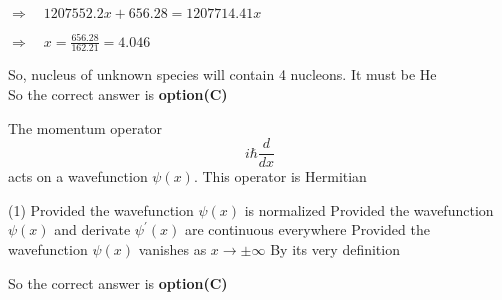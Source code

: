 \begin{questions}
\begin{answer}
	$\Rightarrow \quad 1207552.2 x+656.28=1207714.41 x$
	
	$\Rightarrow \quad x=\frac{656.28}{162.21}=4.046$
	
	So, nucleus of unknown species will contain 4 nucleons. It must be He\\
	So the correct answer is \textbf{option(C)}
\end{answer}
\begin{minipage}{\textwidth}
	\question The momentum operator
	$$
	i \hbar \frac{d}{d x}
	$$
	acts on a wavefunction $\psi(x)$. This operator is Hermitian
\end{minipage}
\begin{tasks}(1)
	\task[\textbf{A.}]   Provided the wavefunction $\psi(x)$ is normalized
	\task[\textbf{B.}]   Provided the wavefunction $\psi(x)$ and derivate $\psi^{\prime}(x)$ are continuous everywhere
	\task[\textbf{C.}] Provided the wavefunction $\psi(x)$ vanishes as $x \rightarrow \pm \infty$
	\task[\textbf{D.}] By its very definition
\end{tasks}
\begin{answer}
	So the correct answer is \textbf{option(C)}
\end{answer}


\end{questions}
